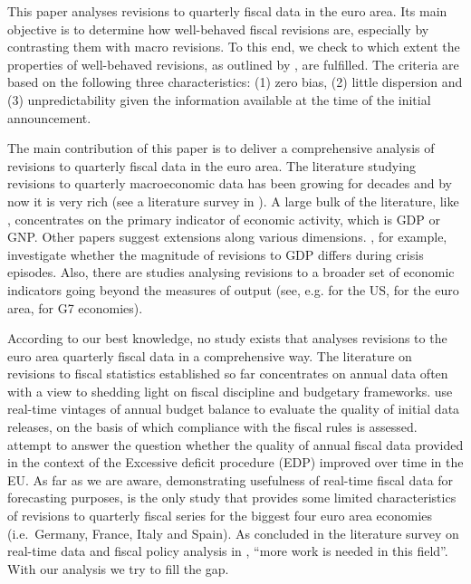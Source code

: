 \documentclass[
  letterpaper,
  authoryear,
  preprint,
  3p]{elsarticle}
\begin{document}
This paper analyses revisions to quarterly fiscal data in the euro area.
Its main objective is to determine how well-behaved fiscal revisions
are, especially by contrasting them with macro revisions. To this end,
we check to which extent the properties of well-behaved revisions, as
outlined by \citet{aruoba2006ijcb}, are fulfilled. The criteria are
based on the following three characteristics: (1) zero bias, (2) little
dispersion and (3) unpredictability given the information available at
the time of the initial announcement.

The main contribution of this paper is to deliver a comprehensive
analysis of revisions to quarterly fiscal data in the euro area. The
literature studying revisions to quarterly macroeconomic data has been
growing for decades and by now it is very rich (see a literature survey
in \citet{Croushore_JEL}). A large bulk of the literature, like
\citet{Mankiw-Shapiro_1986_NBER}, concentrates on the primary indicator
of economic activity, which is GDP or GNP. Other papers suggest
extensions along various dimensions. \citet{Shrestha-Marini_2013_IMF},
for example, investigate whether the magnitude of revisions to GDP
differs during crisis episodes. Also, there are studies analysing
revisions to a broader set of economic indicators going beyond the
measures of output (see, e.g. \citet{aruoba2006ijcb} for the US,
\citet{Branchi-et-al_2007_ECB} for the euro area,
\citet{Faust2005NewsAN} for G7 economies).

According to our best knowledge, no study exists that analyses revisions
to the euro area quarterly fiscal data in a comprehensive way. The
literature on revisions to fiscal statistics established so far
concentrates on annual data often with a view to shedding light on
fiscal discipline and budgetary frameworks.
\citet{decastroetal2013_jmcb} use real-time vintages of annual budget
balance to evaluate the quality of initial data releases, on the basis
of which compliance with the fiscal rules is assessed.
\citet{MaurerKeweloh2017_ecb-sps} attempt to answer the question whether
the quality of annual fiscal data provided in the context of the
Excessive deficit procedure (EDP) improved over time in the EU. As far
as we are aware, \citet{Asimakopoulosetal2020_sje} demonstrating
usefulness of real-time fiscal data for forecasting purposes, is the
only study that provides some limited characteristics of revisions to
quarterly fiscal series for the biggest four euro area economies
(i.e.~Germany, France, Italy and Spain). As concluded in the literature
survey on real-time data and fiscal policy analysis in
\citet{Cimadomo_2016_jes}, ``more work is needed in this field''. With
our analysis we try to fill the gap.
\end{document}
